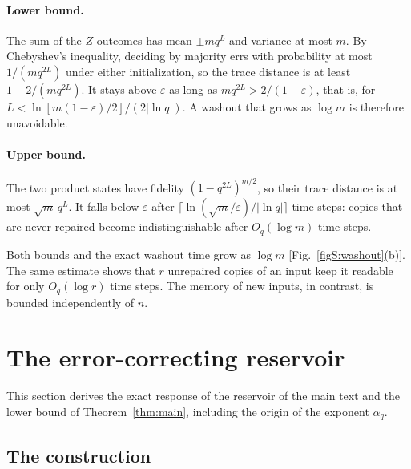\documentclass[aps,prl,twocolumn,superscriptaddress,floatfix]{revtex4-2}
\theoremstyle{plain}
\begin{document}
\paragraph*{Lower bound.} The sum of the $Z$ outcomes has mean $\pm mq^L$ and variance at most $m$. By Chebyshev's inequality, deciding by majority errs with probability at most $1/(mq^{2L})$ under either initialization, so the trace distance is at least $1-2/(mq^{2L})$. It stays above $\varepsilon$ as long as $mq^{2L}>2/(1-\varepsilon)$, that is, for $L<\ln[m(1-\varepsilon)/2]/(2|\ln q|)$. A washout that grows as $\log m$ is therefore unavoidable.

\paragraph*{Upper bound.} The two product states have fidelity $(1-q^{2L})^{m/2}$, so their trace distance is at most $\sqrt m\,q^L$. It falls below $\varepsilon$ after $\lceil\ln(\sqrt m/\varepsilon)/|\ln q|\rceil$ time steps: copies that are never repaired become indistinguishable after $O_q(\log m)$ time steps.

Both bounds and the exact washout time grow as $\log m$ [Fig.~\ref{figS:washout}(b)]. The same estimate shows that $r$ unrepaired copies of an input keep it readable for only $O_q(\log r)$ time steps. The memory of new inputs, in contrast, is bounded independently of $n$.

\section{The error-correcting reservoir}
\label{sm:rep}

This section derives the exact response of the reservoir of the main text and the lower bound of Theorem~\ref{thm:main}, including the origin of the exponent $\alpha_q$.

\subsection{The construction}
\end{document}
